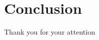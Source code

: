 \documentclass{beamer}
\begin{document}
    
    \section{Conclusion}
    \begin{frame}[standout]
        Thank you for your attention
    \end{frame}
    

    
    
\end{document}
